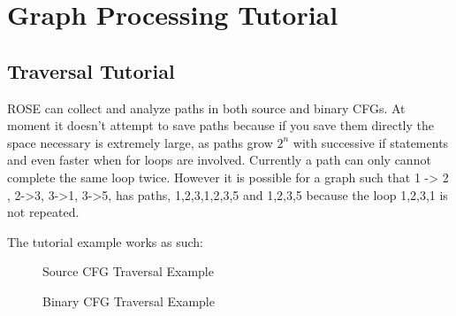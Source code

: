 \chapter{Graph Processing Tutorial}

\section{Traversal Tutorial}
ROSE can collect and analyze paths in both source and binary CFGs. At moment it doesn't attempt to save paths because if
you save them directly the space necessary is extremely large, as paths grow $2^n$ with successive if statements and even faster
when for loops are involved. Currently a path can only cannot complete the same loop twice. However it is possible for a graph
such that 1 -> 2 , 2->3, 3->1, 3->5, has paths, 1,2,3,1,2,3,5 and 1,2,3,5 because the loop 1,2,3,1 is not repeated.

The tutorial example works as such:
\begin{figure}[!h]
{\indent
{\mySmallFontSize

\begin{latexonly}
   
\end{latexonly}

\begin{htmlonly}
   
\end{htmlonly}

}
}
\caption{Source CFG Traversal Example}
\label{Tutorial:SourceCFGTraversalTutorial}
\end{figure}

\begin{figure}[!h]
{\indent
{\mySmallFontSize

\begin{latexonly}
   
\end{latexonly}

\begin{htmlonly}
   
\end{htmlonly}

}
}
\caption{Binary CFG Traversal Example}
\label{Tutorial:BinaryCFGTraversalTutorial}
\end{figure}
